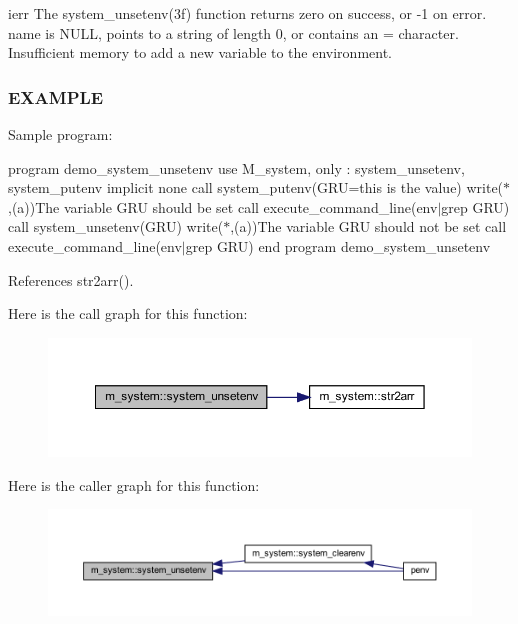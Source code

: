 ierr The system\+\_\+unsetenv(3f) function returns zero on success, or -\/1 on error. name is N\+U\+LL, points to a string of length 0, or contains an \textquotesingle{}=\textquotesingle{} character. Insufficient memory to add a new variable to the environment.

\subsubsection*{E\+X\+A\+M\+P\+LE}

Sample program\+:

program demo\+\_\+system\+\_\+unsetenv use M\+\_\+system, only \+: system\+\_\+unsetenv, system\+\_\+putenv implicit none call system\+\_\+putenv(\textquotesingle{}G\+RU=this is the value\textquotesingle{}) write($\ast$,\textquotesingle{}(a)\textquotesingle{})\textquotesingle{}The variable G\+RU should be set\textquotesingle{} call execute\+\_\+command\+\_\+line(\textquotesingle{}env$\vert$grep G\+RU\textquotesingle{}) call system\+\_\+unsetenv(\textquotesingle{}G\+RU\textquotesingle{}) write($\ast$,\textquotesingle{}(a)\textquotesingle{})\textquotesingle{}The variable G\+RU should not be set\textquotesingle{} call execute\+\_\+command\+\_\+line(\textquotesingle{}env$\vert$grep G\+RU\textquotesingle{}) end program demo\+\_\+system\+\_\+unsetenv 

References str2arr().

Here is the call graph for this function\+:
\nopagebreak
\begin{figure}[H]
\begin{center}
\leavevmode
\includegraphics[width=350pt]{namespacem__system_a61b67b46b35490ec308773b65c3376a3_cgraph}
\end{center}
\end{figure}
Here is the caller graph for this function\+:
\nopagebreak
\begin{figure}[H]
\begin{center}
\leavevmode
\includegraphics[width=350pt]{namespacem__system_a61b67b46b35490ec308773b65c3376a3_icgraph}
\end{center}
\end{figure}


